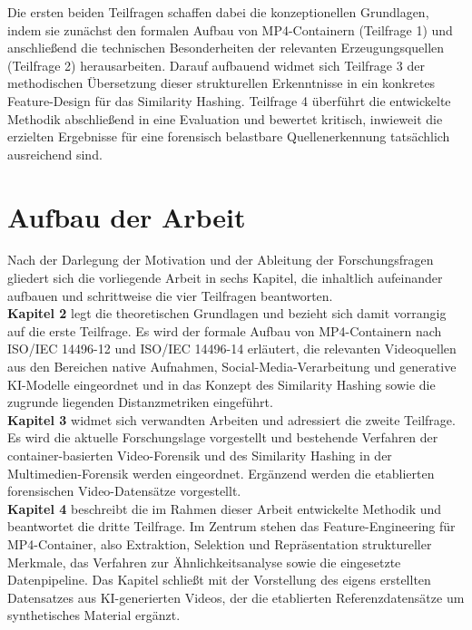 Die ersten beiden Teilfragen schaffen dabei die konzeptionellen Grundlagen, indem sie zunächst den formalen Aufbau von MP4-Containern (Teilfrage 1) und anschließend die technischen Besonderheiten der relevanten Erzeugungsquellen (Teilfrage 2) herausarbeiten. Darauf aufbauend widmet sich Teilfrage 3 der methodischen Übersetzung dieser strukturellen Erkenntnisse in ein konkretes Feature-Design für das Similarity Hashing. Teilfrage 4 überführt die entwickelte Methodik abschließend in eine Evaluation und bewertet kritisch, inwieweit die erzielten Ergebnisse für eine forensisch belastbare Quellenerkennung tatsächlich ausreichend sind.


\section{Aufbau der Arbeit}

Nach der Darlegung der Motivation und der Ableitung der Forschungsfragen gliedert sich die vorliegende Arbeit in sechs Kapitel, die inhaltlich aufeinander aufbauen und schrittweise die vier Teilfragen beantworten.\\

\textbf{Kapitel 2} legt die theoretischen Grundlagen und bezieht sich damit vorrangig auf die erste Teilfrage. Es wird der formale Aufbau von MP4-Containern nach ISO/IEC 14496-12 und ISO/IEC 14496-14 erläutert, die relevanten Videoquellen aus den Bereichen native Aufnahmen, Social-Media-Verarbeitung und generative KI-Modelle eingeordnet und in das Konzept des Similarity Hashing sowie die zugrunde liegenden Distanzmetriken eingeführt.\\

\textbf{Kapitel 3} widmet sich verwandten Arbeiten und adressiert die zweite Teilfrage. Es wird die aktuelle Forschungslage vorgestellt und bestehende Verfahren der container-basierten Video-Forensik und des Similarity Hashing in der Multimedien-Forensik werden eingeordnet. Ergänzend werden die etablierten forensischen Video-Datensätze vorgestellt.\\

\textbf{Kapitel 4} beschreibt die im Rahmen dieser Arbeit entwickelte Methodik und beantwortet die dritte Teilfrage. Im Zentrum stehen das Feature-Engineering für MP4-Container, also Extraktion, Selektion und Repräsentation struktureller Merkmale, das Verfahren zur Ähnlichkeitsanalyse sowie die eingesetzte Datenpipeline. Das Kapitel schließt mit der Vorstellung des eigens erstellten Datensatzes aus KI-generierten Videos, der die etablierten Referenzdatensätze um synthetisches Material ergänzt.\\

